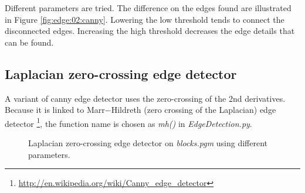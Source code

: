 \documentclass[paper=a4, fontsize=11pt]{scrartcl}
\begin{document}
Different parameters are tried. 
The difference on the edges found are illustrated in Figure \ref{fig:edge:02:canny}.
Lowering the low threshold tends to connect the disconnected edges.
Increasing the high threshold decreases the edge details that can be found.

\subsection{Laplacian zero-crossing edge detector}

A variant of canny edge detector uses the zero-crossing of the 2nd derivatives.
Because it is linked to Marr$-$Hildreth (zero crossing of the Laplacian) edge detector \footnote{\url{http://en.wikipedia.org/wiki/Canny_edge_detector}}, the function name is chosen as \emph{mh()} in \emph{EdgeDetection.py}.

\begin{figure}[h]
\centering
{}
\caption{Laplacian zero-crossing edge detector on \emph{blocks.pgm} using different parameters.}
\label{fig:edge:02:mh}
\end{figure}
\end{document}

